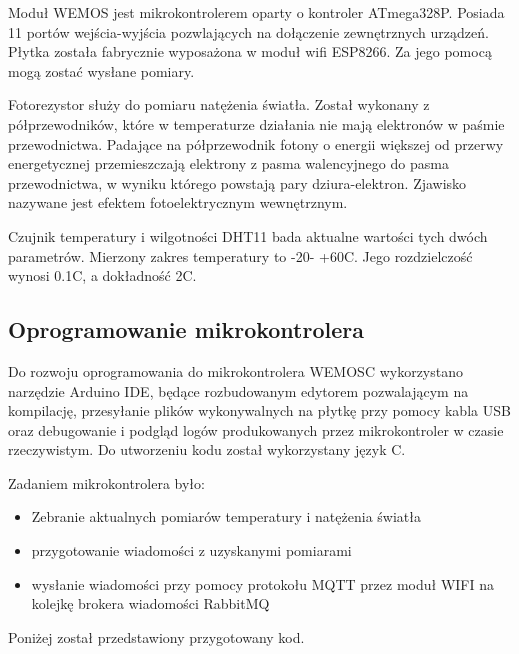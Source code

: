 \documentclass[11pt, a4]{article} %
\begin{document}
Moduł WEMOS jest mikrokontrolerem oparty o kontroler ATmega328P. Posiada
11 portów wejścia-wyjścia pozwlających na dołączenie zewnętrznych 
urządzeń. Płytka została fabrycznie wyposażona w moduł wifi ESP8266. Za
jego pomocą mogą zostać wysłane pomiary.

Fotorezystor służy do pomiaru natężenia światła. Został wykonany 
z półprzewodników, które w temperaturze działania nie mają elektronów 
w paśmie przewodnictwa. Padające na półprzewodnik fotony o energii 
większej od przerwy energetycznej przemieszczają elektrony z pasma 
walencyjnego do pasma przewodnictwa, w wyniku którego powstają pary 
dziura-elektron. Zjawisko nazywane jest efektem fotoelektrycznym 
wewnętrznym.

Czujnik temperatury i wilgotności DHT11 bada aktualne wartości tych
dwóch parametrów. Mierzony zakres temperatury to -20\degree  - +60\degree C.
Jego rozdzielczość wynosi 0.1\degree C, a dokładność 2\degree C.

\subsection{Oprogramowanie mikrokontrolera}

Do rozwoju oprogramowania do mikrokontrolera WEMOSC wykorzystano narzędzie 
Arduino IDE, będące rozbudowanym edytorem pozwalającym na kompilację,
przesyłanie plików wykonywalnych na płytkę przy pomocy kabla USB oraz
debugowanie i podgląd logów produkowanych przez mikrokontroler w czasie 
rzeczywistym. Do utworzeniu kodu został wykorzystany język C.

Zadaniem mikrokontrolera było:

\begin{itemize} %
    \item Zebranie aktualnych pomiarów temperatury i natężenia światła
    \item przygotowanie wiadomości z uzyskanymi pomiarami
    \item wysłanie wiadomości przy pomocy protokołu MQTT przez moduł WIFI na 
    kolejkę brokera wiadomości RabbitMQ
\end{itemize}

Poniżej został przedstawiony przygotowany kod.
\end{document}
